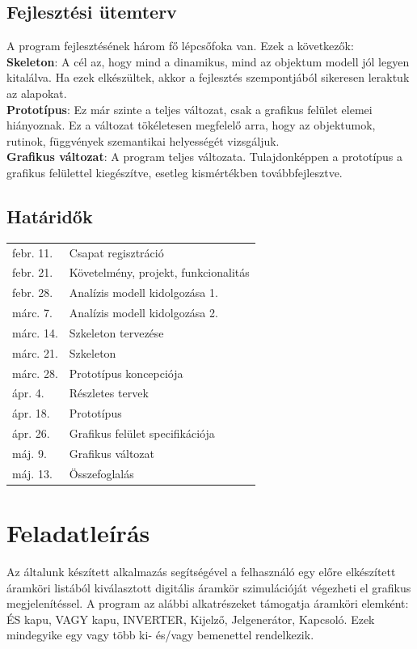 \subsection{Fejlesztési ütemterv}

A program fejlesztésének három fő lépcsőfoka van. Ezek a következők:\\
\textbf{Skeleton}: A cél az, hogy mind a dinamikus, mind az objektum modell jól legyen kitalálva. Ha ezek elkészültek, akkor a fejlesztés szempontjából sikeresen leraktuk az alapokat.\\
\textbf{Prototípus}: Ez már szinte a teljes változat, csak a grafikus felület elemei hiányoznak. Ez a változat tökéletesen megfelelő arra, hogy az objektumok, rutinok, függvények szemantikai helyességét vizsgáljuk.\\
\textbf{Grafikus változat}: A program teljes változata. Tulajdonképpen a prototípus a grafikus felülettel kiegészítve, esetleg kismértékben továbbfejlesztve.

\subsection{Határidők}

\begin{tabular}{l | l}
febr. 11. & Csapat regisztráció \\
febr. 21. & Követelmény, projekt, funkcionalitás \\
febr. 28. & Analízis modell kidolgozása 1. \\
márc. 7. & Analízis modell kidolgozása 2. \\
márc. 14. & Szkeleton tervezése \\
márc. 21. & Szkeleton \\
márc. 28. & Prototípus koncepciója \\
ápr.  4. & Részletes tervek \\
ápr. 18. & Prototípus \\
ápr. 26. & Grafikus felület specifikációja \\
máj. 9. & Grafikus változat \\
máj. 13. & Összefoglalás
\end{tabular}

\section{Feladatleírás}
\label{sec:taskdesc}

Az általunk készített alkalmazás segítségével a felhasználó egy előre elkészített áramköri listából kiválasztott digitális áramkör szimulációját végezheti el grafikus megjelenítéssel. A program az alábbi alkatrészeket támogatja áramköri elemként: ÉS kapu, VAGY kapu, INVERTER, Kijelző, Jelgenerátor, Kapcsoló. Ezek mindegyike egy vagy több ki- és/vagy bemenettel rendelkezik.\\

